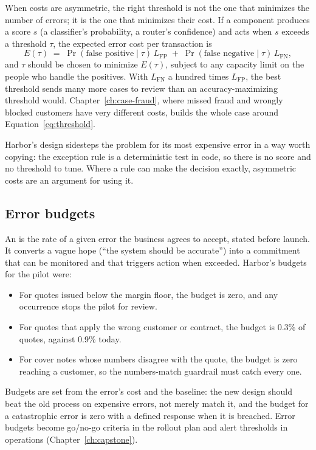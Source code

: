 When costs are asymmetric, the right threshold is not the one that minimizes the number of errors; it is the one that minimizes their cost. If a component produces a score $s$ (a classifier's probability, a router's confidence) and acts when $s$ exceeds a threshold $\tau$, the expected error cost per transaction is
\begin{equation}
  E(\tau) \;=\; \Pr(\text{false positive} \mid \tau)\, L_{\text{FP}} \;+\; \Pr(\text{false negative} \mid \tau)\, L_{\text{FN}},
  \label{eq:threshold}
\end{equation}
and $\tau$ should be chosen to minimize $E(\tau)$, subject to any capacity limit on the people who handle the positives. With $L_{\text{FN}}$ a hundred times $L_{\text{FP}}$, the best threshold sends many more cases to review than an accuracy-maximizing threshold would. Chapter~\ref{ch:case-fraud}, where missed fraud and wrongly blocked customers have very different costs, builds the whole case around Equation~\eqref{eq:threshold}.

Harbor's design sidesteps the problem for its most expensive error in a way worth copying: the exception rule is a deterministic test in code, so there is no score and no threshold to tune. Where a rule can make the decision exactly, asymmetric costs are an argument for using it.

\subsection{Error budgets}

An  is the rate of a given error the business agrees to accept, stated before launch. It converts a vague hope (``the system should be accurate'') into a commitment that can be monitored and that triggers action when exceeded. Harbor's budgets for the pilot were:
\begin{itemize}[itemsep=1pt]
  \item For quotes issued below the margin floor, the budget is zero, and any occurrence stops the pilot for review.
  \item For quotes that apply the wrong customer or contract, the budget is 0.3\% of quotes, against 0.9\% today.
  \item For cover notes whose numbers disagree with the quote, the budget is zero reaching a customer, so the numbers-match guardrail must catch every one.
\end{itemize}
Budgets are set from the error's cost and the baseline: the new design should beat the old process on expensive errors, not merely match it, and the budget for a catastrophic error is zero with a defined response when it is breached. Error budgets become go/no-go criteria in the rollout plan and alert thresholds in operations (Chapter~\ref{ch:capstone}).

